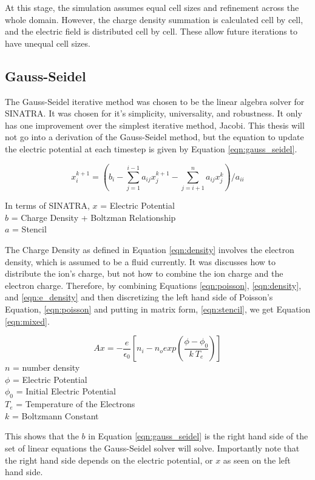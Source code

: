 \indent At this stage, the simulation assumes equal cell sizes and refinement across the whole domain. However, the charge density summation is calculated cell by cell, and the electric field is distributed cell by cell. These allow future iterations to have unequal cell sizes. \par


\subsection{Gauss-Seidel}
\label{sec:gauss}

The Gauss-Seidel iterative method was chosen to be the linear algebra solver for SINATRA. It was chosen for it's simplicity, universality, and robustness. It only has one improvement over the simplest iterative method, Jacobi. This thesis will not go into a derivation of the Gauss-Seidel method, but the equation to update the electric potential at each timestep is given by Equation \ref{eqn:gauss_seidel}.

\begin{equation}
    \label{eqn:gauss_seidel}
    x_i^{k+1} = ( b_i - \sum_{j=1}^{i-1} a_{i j} x_j^{k+1} - \sum_{j=i+1}^n a_{i j} x_j^{k} ) / a_{ii}
\end{equation}

In terms of SINATRA,
\(x\) = Electric Potential \\
\(b\) = Charge Density + Boltzman Relationship \\
\(a\) = Stencil \par


\indent The Charge Density as defined in Equation \ref{eqn:density} involves the electron density, which is assumed to be a fluid currently. It was discusses how to distribute the ion's charge, but not how to combine the ion charge and the electron charge. Therefore, by combining Equations \ref{eqn:poisson}, \ref{eqn:density}, and \ref{eqn:e_density} and then discretizing the left hand side of Poisson's Equation, \ref{eqn:poisson} and putting in matrix form, \ref{eqn:stencil}, we get Equation \ref{eqn:mixed}.

\begin{equation}
    \label{eqn:mixed}
    A x = - \frac{e}{\epsilon_0} [n_i - n_o exp(\frac{\phi - \phi_0}{k \: T_e})]
\end{equation}
\(n\) = number density \\
\(\phi\) = Electric Potential \\
\(\phi_0\) = Initial Electric Potential \\
\(T_e\) = Temperature of the Electrons \\
\(k\) = Boltzmann Constant \par

\indent This shows that the \(b\) in Equation \ref{eqn:gauss_seidel} is the right hand side of the set of linear equations the Gauss-Seidel solver will solve. Importantly note that the right hand side depends on the electric potential, or \(x\) as seen on the left hand side. \par
